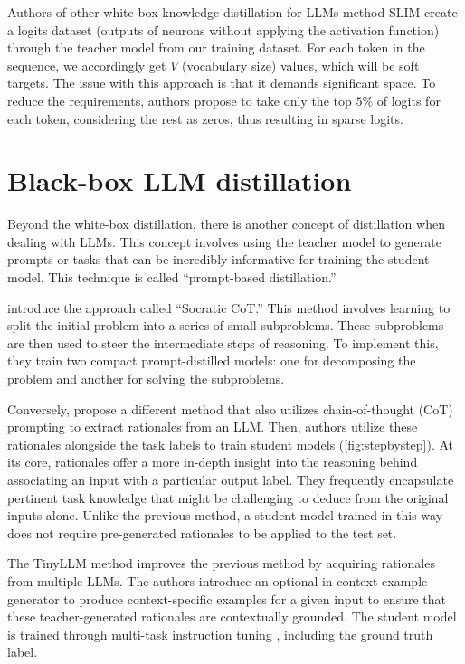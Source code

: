 Authors of other white-box knowledge distillation for LLMs method SLIM \cite{slim} create a logits dataset (outputs of neurons without applying the activation function) through the teacher model from our training dataset. For each token in the sequence, we accordingly get $V$ (vocabulary size) values, which will be soft targets. The issue with this approach is that it demands significant space. To reduce the requirements, authors propose to take only the top $5\%$ of logits for each token, considering the rest as zeros, thus resulting in sparse logits.

\section{Black-box LLM distillation}
\label{section:blackbox}

Beyond the white-box distillation, there is another concept of distillation when dealing with LLMs. This concept involves using the teacher model to generate prompts or tasks that can be incredibly informative for training the student model. This technique is called “prompt-based distillation.”

\citeauthor{socraticcot} \cite{socraticcot} introduce the approach called ``Socratic CoT\@.'' This method involves learning to split the initial problem into a series of small subproblems. These subproblems are then used to steer the intermediate steps of reasoning. To implement this, they train two compact prompt-distilled models: one for decomposing the problem and another for solving the subproblems.

Conversely, \citeauthor{stepbystep} \cite{stepbystep} propose a different method that also utilizes chain-of-thought (CoT) \cite{cot} prompting to extract rationales from an LLM\@. Then, authors utilize these rationales alongside the task labels to train student models (\autoref{fig:stepbystep}). At its core, rationales offer a more in-depth insight into the reasoning behind associating an input with a particular output label. They frequently encapsulate pertinent task knowledge that might be challenging to deduce from the original inputs alone. Unlike the previous method, a student model trained in this way does not require pre-generated rationales to be applied to the test set.

The TinyLLM method \cite{tinyllm} improves the previous method by acquiring rationales from multiple LLMs. The authors introduce an optional in-context example generator to produce context-specific examples for a given input to ensure that these teacher-generated rationales are contextually grounded. The student model is trained through multi-task instruction tuning \cite{t5,t0}, including the ground truth label.

